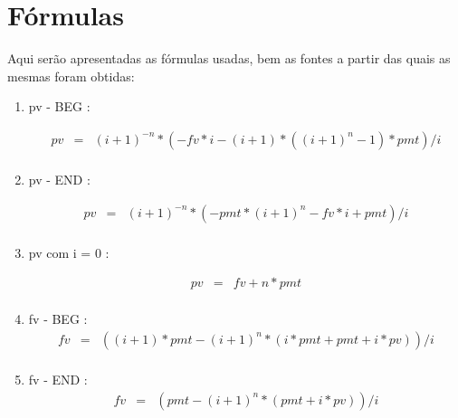 \chapter{Fórmulas} \label{formulas}

Aqui serão apresentadas as fórmulas usadas, bem as fontes a partir das quais as mesmas foram obtidas: \\

\begin{enumerate}
 \item pv - BEG \cite{arachnoid}:

\begin{eqnarray*}
pv &=& (i+1)^{-n} * ( -fv*i - (i+1) * ( (i+1)^{n} -1)*pmt  ) / i\\
\end{eqnarray*}


\item pv - END \cite{arachnoid}:

\begin{eqnarray*}
	pv &=& (i+1)^{-n} * ( -pmt*(i+1)^{n} - fv*i + pmt) / i \\
\end{eqnarray*}


\item pv com i = 0 \cite{matFinanceira}: 

\begin{eqnarray*}
  pv &=& fv + n * pmt  \\
\end{eqnarray*} 


\item fv - BEG \cite{arachnoid}:
\begin{eqnarray*}
 fv &=& ( (i+1)*pmt - (i+1)^{n}*(i*pmt + pmt + i*pv) ) / i \\
\end{eqnarray*}


\item fv - END \cite{arachnoid}: 
\begin{eqnarray*}
fv &=& ( pmt - (i+1)^{n} * (pmt + i*pv) ) / i \\
\end{eqnarray*}



\end{enumerate}
